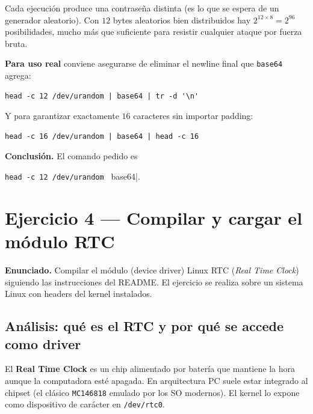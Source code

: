 \documentclass[11pt,a4paper]{article}
\begin{document}
\begin{idea}
Cada ejecución produce una contraseña distinta (es lo que se espera de
un generador aleatorio). Con $12$ bytes aleatorios bien distribuidos
hay $2^{12 \times 8} = 2^{96}$ posibilidades, mucho más que suficiente
para resistir cualquier ataque por fuerza bruta.
\end{idea}

\begin{importante}
\textbf{Para uso real} conviene asegurarse de eliminar el newline
final que \texttt{base64} agrega:

\begin{lstlisting}[style=shellstyle]
head -c 12 /dev/urandom | base64 | tr -d '\n'
\end{lstlisting}

\noindent Y para garantizar exactamente $16$ caracteres sin importar
padding:

\begin{lstlisting}[style=shellstyle]
head -c 16 /dev/urandom | base64 | head -c 16
\end{lstlisting}
\end{importante}

\textbf{Conclusión.} El comando pedido es

\verb|head -c 12 /dev/urandom | base64|.

\section{Ejercicio 4 --- Compilar y cargar el módulo RTC}

\textbf{Enunciado.} Compilar el módulo (device driver) Linux RTC
(\emph{Real Time Clock}) siguiendo las instrucciones del README. El
ejercicio se realiza sobre un sistema Linux con headers del kernel
instalados.

\subsection*{Análisis: qué es el RTC y por qué se accede como driver}

El \textbf{Real Time Clock} es un chip alimentado por batería que
mantiene la hora aunque la computadora esté apagada. En arquitectura
PC suele estar integrado al chipset (el clásico \texttt{MC146818}
emulado por los SO modernos). El kernel lo expone como dispositivo de
carácter en \texttt{/dev/rtc0}.
\end{document}
